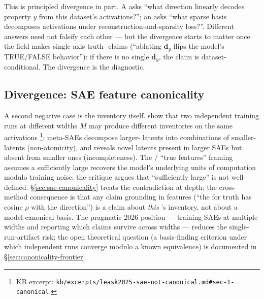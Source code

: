 This is principled divergence in part. A  asks ``what
direction linearly decodes property $y$ from this dataset's
activations?''; an  asks ``what sparse basis decomposes
activations under reconstruction-and-sparsity loss?''. Different
answers need not falsify each other --- but the divergence starts to
matter once the field makes single-axis truth- claims
(``ablating $\mathbf{d}_y$ flips the model's TRUE/FALSE behavior''):
if there is no single $\mathbf{d}_y$, the claim is
dataset-conditional. The divergence is the diagnostic.

\subsection{Divergence: SAE feature canonicality}
\label{sec:cross-sae}

A second negative case is the   inventory itself.
\citet{leask2025-sae-not-canonical} show that two independent 
training runs at different widths $M$ may produce different
 inventories on the same activations
\citep[\S 1]{leask2025-sae-not-canonical}\footnote{KB excerpt:
\nolinkurl{kb/excerpts/leask2025-sae-not-canonical.md#sec-1-canonical}.}:
meta-SAEs decompose larger- latents into combinations of
smaller- latents (non-atomicity), and  reveals
novel latents present in larger SAEs but absent from smaller ones
(incompleteness). The
\citet{bricken2023-monosemanticity}/\citet{templeton2024-scaling-monosemanticity}
``true features'' framing assumes a sufficiently large 
recovers the model's underlying units of computation modulo
training noise; the \citeauthor{leask2025-sae-not-canonical}
critique argues that ``sufficiently large'' is not well-defined.
\S\ref{sec:sae-canonicality} treats the contradiction at depth;
the cross-method consequence is that any claim grounding in 
features (``the   for truth has cosine $\rho$ with the
 direction'') is a claim about \emph{this} 's inventory,
not about a model-canonical basis. The pragmatic 2026 position ---
training SAEs at multiple widths and reporting which claims survive
across widths --- reduces the single-run-artifact risk; the open
theoretical question (a basis-finding criterion under which
independent runs converge modulo a known equivalence) is
documented in \S\ref{sec:canonicality-frontier}.

